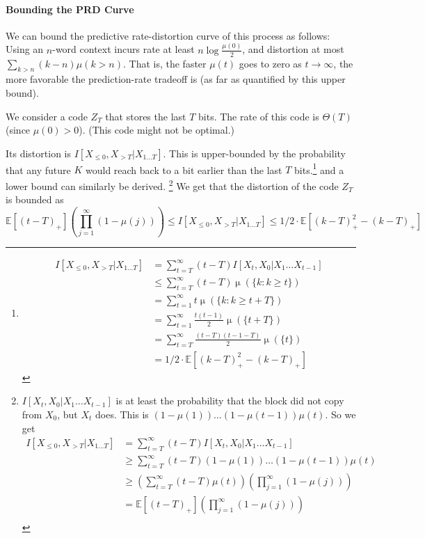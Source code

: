 \documentclass[11pt,letterpaper]{article}
\newcommand{\E}[0]{\mathbb{E}}
\begin{document}
\paragraph{Bounding the PRD Curve}
We can bound the predictive rate-distortion curve of this process as follows:
Using an $n$-word context incurs rate at least $n \log \frac{\mu(0)}{2}$, and distortion at most $\sum_{k > n} (k-n) \mu(k > n)$. That is, the faster $\mu(t)$ goes to zero as $t \rightarrow \infty$, the more favorable the prediction-rate tradeoff is (as far as quantified by this upper bound).


We consider a code $Z_T$ that stores the last $T$ bits.
The rate of this code is $\Theta(T)$ (since $\mu(0) > 0$).
(This code might not be optimal.)


Its distortion is $I[X_{\leq 0}, X_{>T}|X_{1\dots T}]$.
This is upper-bounded by the probability that any future $K$ would reach back to a bit earlier than the last $T$ bits.\footnote{
\begin{align*}
I[X_{\leq 0}, X_{>T}|X_{1\dots T}] & = \sum_{t=T}^\infty (t-T) I[X_t, X_0|X_1\dots X_{t-1}] \\
& \leq \sum_{t=T}^\infty (t-T) \operatorname{\mu}(\{k : k \geq t\}) \\
& = \sum_{t=1}^\infty t \operatorname{\mu}(\{k : k \geq t+T\}) \\
&= \sum_{t=1}^\infty \frac{t(t-1)}{2} \operatorname{\mu}(\{t+T\}) \\
&= \sum_{t=T}^\infty \frac{(t-T)(t-1-T)}{2} \operatorname{\mu}(\{t\}) \\
&= 1/2 \cdot \E[(k-T)_+^2-(k-T)_+]
\end{align*}}
and a lower bound can similarly be derived. \footnote{$I[X_t, X_0|X_1\dots X_{t-1}]$ is at least the probability that the block did not copy from $X_0$, but $X_t$ does.
This is $(1-\mu(1))\dots(1-\mu(t-1))\mu(t)$. So we get
\begin{align*}
I[X_{\leq 0}, X_{>T}|X_{1\dots T}] & = \sum_{t=T}^\infty (t-T) I[X_t, X_0|X_1\dots X_{t-1}] \\
& \geq \sum_{t=T}^\infty (t-T) (1-\mu(1))\dots(1-\mu(t-1))\mu(t) \\
& \geq \left(\sum_{t=T}^\infty (t-T)\mu(t) \right) \left( \prod_{j=1}^\infty (1-\mu(j))\right) \\
& = \E \left[(t-T)_+ \right] \left( \prod_{j=1}^\infty (1-\mu(j))\right) \\
\end{align*}}
We get that the distortion of the code $Z_T$ is bounded as 
\begin{equation}
\E \left[(t-T)_+ \right] \left( \prod_{j=1}^\infty (1-\mu(j))\right) \leq I[X_{\leq 0}, X_{>T}|X_{1\dots T}] \leq 1/2 \cdot \E[(k-T)_+^2-(k-T)_+]
\end{equation}
\end{document}
